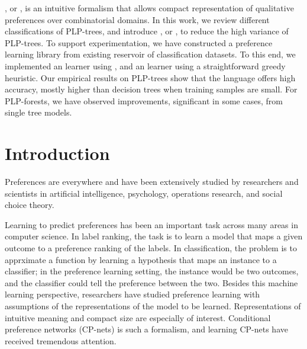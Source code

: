 , or , 
is an intuitive formalism that allows compact representation
of qualitative preferences over combinatorial domains.
In this work, we review different classifications of PLP-trees,
and introduce ,
or , to reduce the high variance of PLP-trees.
To support experimentation, we have constructed a preference
learning library from existing reservoir of classification
datasets.
To this end, we implemented an  learner using
, and an 
learner using a straightforward greedy heuristic.
Our empirical results on PLP-trees show that the language offers
high accuracy, mostly higher than decision trees when training samples
are small.
For PLP-forests, we have observed improvements, significant in some cases,
from single tree models.


\section{Introduction}
Preferences are everywhere and have been extensively studied
by researchers and scientists in artificial intelligence,
psychology, operations research, and social choice theory.


Learning to predict preferences has been an important task across many
areas in computer science.
In label ranking, the task is to learn a model that
maps a given outcome to a preference ranking of the labels.
In classification, the problem is to apprximate
a function by learning a hypothesis that maps an instance
to a classifier; in the preference learning setting,
the instance would be two outcomes, and the classifier could
tell the preference between the two.
Besides this machine learning perspective,
researchers have studied preference learning with
assumptions of the representations of the model to
be learned.
Representations of intuitive meaning and compact size
are especially of interest.
Conditional preference networks (CP-nets)\cite{boutilier2004cp}
is such a formalism, and learning CP-nets have 
received tremendous attention.

